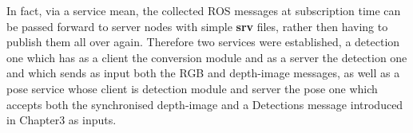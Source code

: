 In fact, via a service mean, the collected ROS messages at subscription time can be passed forward to server nodes with simple \textbf{srv} files, rather then having to publish them all over again. Therefore two services were established, a detection one which has as a client the conversion module and as a server the detection one and which sends as input both the RGB and depth-image messages, as well as a pose service whose client is detection module and server the pose one which accepts both the synchronised depth-image and a Detections message introduced in Chapter3 as inputs.



